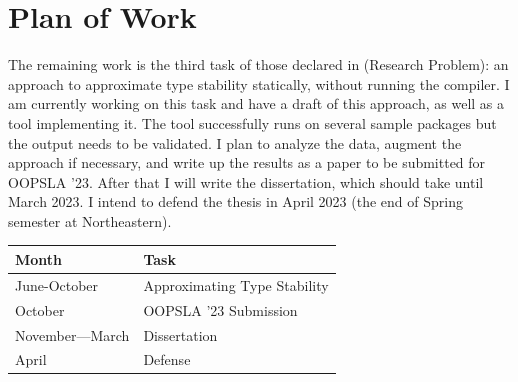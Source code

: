 





\chapter{Plan of Work}%
\label{chap-plan}

The remaining work is the third task of those declared in
 (Research Problem): an approach to
approximate type stability statically, without running
the compiler. I am currently working on this task and have a draft of this
approach, as well as a tool implementing it.
The tool successfully runs on several sample packages but the output needs to be
validated.
I plan to analyze the data, augment the approach if necessary, and
write up the results as a paper to be submitted for
OOPSLA '23. After that I will write the dissertation, which
should take until March 2023. I intend to defend the thesis in April 2023 (the
end of Spring semester at Northeastern).

\begin{center}
  \begin{tabular}{ll}
    \toprule
    \textbf{Month} & \textbf{Task} \\
    \midrule
    June-October & Approximating Type Stability\\
    October & OOPSLA '23 Submission\\
    November---March & Dissertation\\
    April & Defense\\
    \bottomrule
  \end{tabular}
\end{center}
